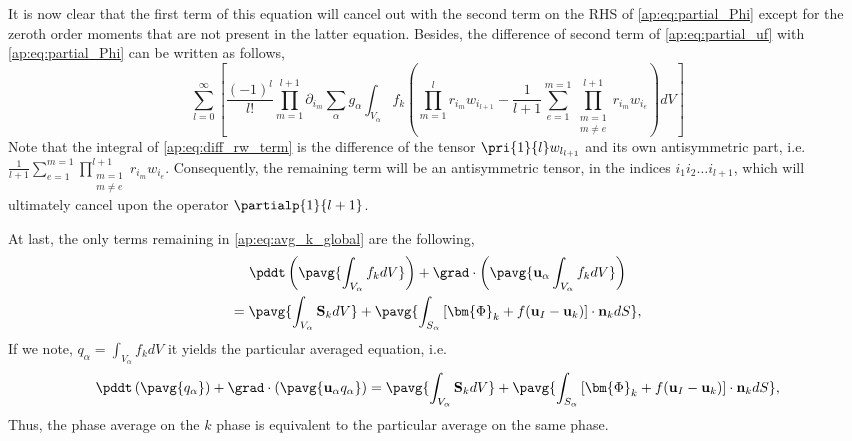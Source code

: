 It is now clear that the first term of this equation will cancel out with the second term on the RHS of \ref{ap:eq:partial_Phi} except for the zeroth order moments that are not present in the latter equation.
Besides, the difference of second term of \ref{ap:eq:partial_uf} with \ref{ap:eq:partial_Phi} can be written as follows, 
\begin{equation}    
    \sum_{l=0}^\infty  
    \left[
        \frac{(-1)^l}{l!} \prod^{l+1}_{m=1}\partial_{i_m}
        \sum_\alpha  g_\alpha 
        \int_{V_\alpha} f_k\left(
            \prod^l_{m=1}r_{i_m} w_{i_{l+1}} 
            -
            \frac{1}{l+1}
            \sum_{e=1}^{m=1} 
            \prod^{l+1}_{\substack{m=1\\ m\neq e}} 
            r_{i_m} 
            w_{i_e}
        \right)
        dV
    \right]
    \label{ap:eq:diff_rw_term}
\end{equation}
Note that the integral of \ref{ap:eq:diff_rw_term} is the difference of the tensor $\pri{1}{l}w_{l_{l+1}}$ and its own antisymmetric part, i.e. $\frac{1}{l+1} \sum_{e=1}^{m=1} \prod^{l+1}_{\substack{m=1\\ m\neq e}} r_{i_m} w_{i_e}$.
Consequently, the remaining term will be an antisymmetric tensor, in the indices $i_1i_2\ldots i_{l+1}$, which will ultimately cancel upon the operator $\partialp{1}{l+1}$.

At last, the only terms remaining in \ref{ap:eq:avg_k_global} are the following,
\begin{multline*}
    \pddt   \left(\pavg{\int_{V_\alpha} f_k dV}\right)
    + \grad \cdot \left(\pavg{\textbf{u}_\alpha \int_{V_\alpha} f_k  dV  }\right)\\
    = \pavg{\int_{V_\alpha} \textbf{S}_k dV }
    + \pavg{\int_{S_\alpha} \left[\bm{\Phi}_k 
    + f (\textbf{u}_I-\textbf{u}_k) \right] \cdot \textbf{n}_k d S},
\end{multline*}
If we note, $q_\alpha = \int_{V_\alpha} f_k dV$ it yields the particular averaged equation, i.e. 
\begin{equation}
    \pddt   \left(\pavg{q_\alpha}\right)
    + \grad \cdot \left(\pavg{\textbf{u}_\alpha q_\alpha  }\right)
    = \pavg{\int_{V_\alpha} \textbf{S}_k dV }
    + \pavg{\int_{S_\alpha} \left[\bm{\Phi}_k 
    + f (\textbf{u}_I-\textbf{u}_k) \right] \cdot \textbf{n}_k d S},
\end{equation}
Thus, the phase average on the $k$ phase is equivalent to the particular average on the same phase. 




